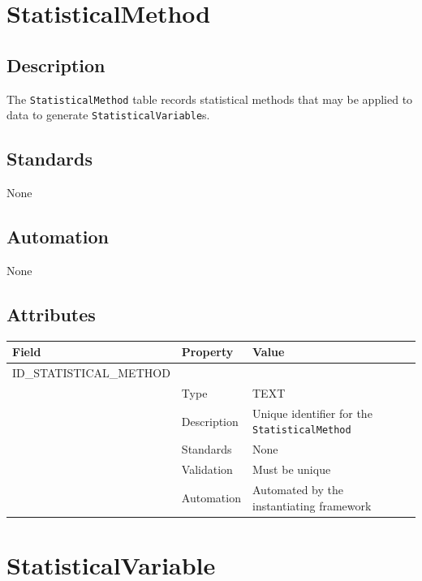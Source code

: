 \documentclass[
]{article}
\newcounter{none} %
\begin{document}
\section{StatisticalMethod}\label{statisticalmethod}

\subsection{Description}\label{description-29}

The \texttt{StatisticalMethod} table records statistical methods that
may be applied to data to generate \texttt{StatisticalVariable}s.

\subsection{Standards}\label{standards-31}

None

\subsection{Automation}\label{automation-31}

None

\subsection{Attributes}\label{attributes-26}

{\def\LTcaptype{none} %
\begin{longtable}[]{@{}lll@{}}
\toprule\noalign{}
Field & Property & Value \\
\midrule\noalign{}
\endhead
\bottomrule\noalign{}
\endlastfoot
ID\_STATISTICAL\_METHOD & & \\
& Type & TEXT \\
& Description & Unique identifier for the \texttt{StatisticalMethod} \\
& Standards & None \\
& Validation & Must be unique \\
& Automation & Automated by the instantiating framework \\
\end{longtable}
}

\section{StatisticalVariable}\label{statisticalvariable}
\end{document}
